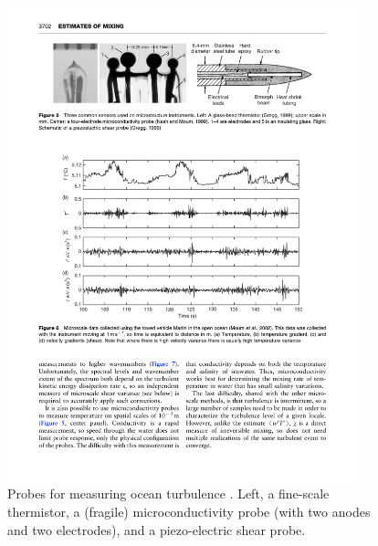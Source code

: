 \documentclass[11pt]{article}
\begin{document}
\begin{figure}[hbtp]
  \begin{center}
    \includegraphics[width=4in]{images/KlymakNash09Fig5}
    \caption{Probes for measuring ocean turbulence \citep{klymaknash09}.  Left,
a fine-scale thermistor, a (fragile) microconductivity probe (with two anodes
and two electrodes), and a piezo-electric shear probe.}   
    \label{fig:KlymakNash09Fig5}
  \end{center}
\end{figure}
\end{document}
